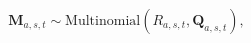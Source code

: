 \begin{equation}
  \boldsymbol{M}_{a, s, t} 
  \sim
  \text{Multinomial}(R_{a, s, t}, \boldsymbol{Q}_{a, s, t}),
  \label{eqn:capture-recapture-submodel}
\end{equation}